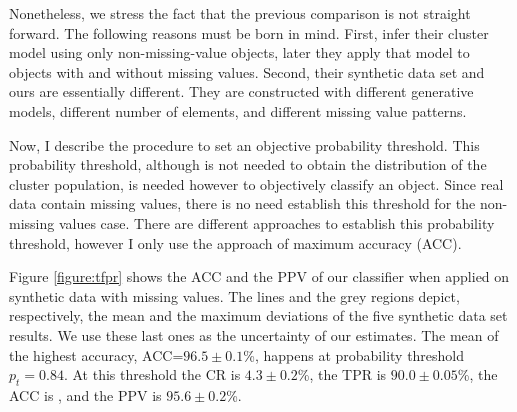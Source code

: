 Nonetheless, we stress the fact that the previous comparison is not straight forward. The following reasons must be born in mind. First, \citet{Sarro2014} infer their cluster model using only non-missing-value objects, later they apply that model to objects with and without missing values. Second, their synthetic data set and ours are essentially different. They are constructed with different generative models, different number of elements, and different missing value patterns. 

Now, I describe the procedure to set an objective probability threshold. This probability threshold, although is not needed to obtain the distribution of the cluster population, is needed however to objectively classify an object. Since real data contain missing values, there is no need establish this threshold for the non-missing values case. There are different approaches to establish this probability threshold, however I only use the approach of maximum accuracy (ACC). 

Figure \ref{figure:tfpr} shows the ACC and the PPV of our classifier when applied on synthetic data with missing values. The lines and the grey regions depict, respectively, the mean and the maximum deviations of the five synthetic data set results. We use these last ones as the uncertainty of our estimates. The mean of the highest accuracy, ACC=$96.5\pm0.1$\%, happens at probability threshold $p_t = 0.84$. At this threshold the CR is $4.3\pm0.2$\%, the TPR is $90.0\pm0.05$\%, the ACC is , and the PPV is $95.6\pm0.2$\%. 

\begin{figure*}[!htp]
\begin{center}
\caption{Left: The TPR (solid line) and CR (dashed line) of our methodology  when applied on synthetic data sets with and without missing values (red and blue lines, respectively). In black dots we show the TPR and CR reported by \citet{Sarro2014} for their non-missing values model. Right: Accuracy and precision as a function of probability threshold for our classifier when applied on synthetic data with missing values. The higher accuracy is obtained at $p_t=0.84$ (red dot). In both panels, the grey areas show the maximum deviations from the mean of the results of the five missing-values synthetic data sets.}
\label{figure:tfpr}
\end{center}
\end{figure*}

